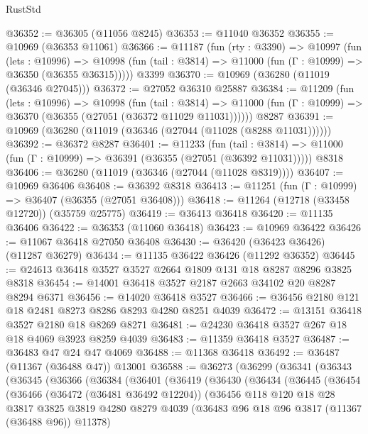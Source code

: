 \begin{lexlean}{RustStd}
\begin{coremodule}
@36352 := @36305 (@11056 @8245)
@36353 := @11040 @36352
@36355 := @10969 (@36353 @11061)
@36366 := @11187
    (fun (rty : @3390) =>
    @10997
      (fun (lets : @10996) =>
      @10998 (fun (tail : @3814) => @11000 (fun (Γ : @10999) => @36350 (@36355 @36315)))))
    @3399
@36370 := @10969 (@36280 (@11019 (@36346 @27045)))
@36372 := @27052 @36310 @25887
@36384 := @11209
    (fun (lets : @10996) =>
    @10998
      (fun (tail : @3814) =>
      @11000 (fun (Γ : @10999) => @36370 (@36355 (@27051 (@36372 @11029 @11031))))))
    @8287
@36391 := @10969 (@36280 (@11019 (@36346 (@27044 (@11028 (@8288 @11031))))))
@36392 := @36372 @8287
@36401 := @11233
    (fun (tail : @3814) => @11000 (fun (Γ : @10999) => @36391 (@36355 (@27051 (@36392 @11031)))))
    @8318
@36406 := @36280 (@11019 (@36346 (@27044 (@11028 @8319))))
@36407 := @10969 @36406
@36408 := @36392 @8318
@36413 := @11251 (fun (Γ : @10999) => @36407 (@36355 (@27051 @36408)))
@36418 := @11264 (@12718 (@33458 @12720)) (@35759 @25775)
@36419 := @36413 @36418
@36420 := @11135 @36406
@36422 := @36353 (@11060 @36418)
@36423 := @10969 @36422
@36426 := @11067 @36418 @27050 @36408
@36430 := @36420 (@36423 @36426) (@11287 @36279)
@36434 := @11135 @36422 @36426 (@11292 @36352)
@36445 := @24613 @36418 @3527 @3527 @2664 @1809 @131 @18 @8287 @8296 @3825 @8318
@36454 := @14001 @36418 @3527 @2187 @2663 @34102 @20 @8287 @8294 @6371
@36456 := @14020 @36418 @3527
@36466 := @36456 @2180 @121 @18 @2481 @8273 @8286 @8293 @4280 @8251 @4039
@36472 := @13151 @36418 @3527 @2180 @18 @8269 @8271
@36481 := @24230 @36418 @3527 @267 @18 @18 @4069 @3923 @8259 @4039
@36483 := @11359 @36418 @3527
@36487 := @36483 @47 @24 @47 @4069
@36488 := @11368 @36418
@36492 := @36487 (@11367 (@36488 @47)) @13001
@36588 := @36273
    (@36299
      (@36341
        (@36343
          (@36345
            (@36366
              (@36384
                (@36401
                  (@36419
                    (@36430
                      (@36434
                        (@36445
                          (@36454
                            (@36466
                              (@36472 (@36481 @36492 @12204))
                              (@36456
                                @118
                                @120
                                @18
                                @28
                                @3817
                                @3825
                                @3819
                                @4280
                                @8279
                                @4039
                                (@36483 @96 @18 @96 @3817 (@11367 (@36488 @96)) @11378)

\end{coremodule}
\end{lexlean}
